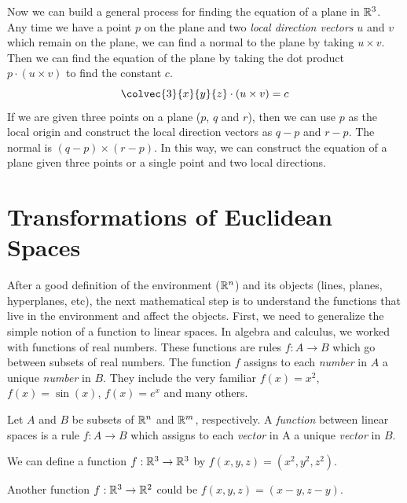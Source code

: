 \documentclass[fleqn,letterpaper]{report}
\begin{document}
Now we can build a general process for finding the
equation of a plane in $\mathbb{R}^3$. Any time we have a point $p$
on the plane and two \emph{local direction vectors} $u$ and
$v$ which remain on the plane, we can find a normal to the
plane by taking $u \times v$. Then we can find the equation
of the plane by taking the dot product $p \cdot (u \times v)$
to find the constant $c$. 
\begin{displaymath}
\colvec{3}{x}{y}{z} \cdot (u \times v) = c
\end{displaymath} 
If we are given three points on a plane ($p$, $q$ and $r$), then
we can use $p$ as the local origin and construct the local
direction vectors as $q-p$ and $r-p$. The normal is $(q-p)
\times (r-p)$. In this way, we can construct the equation of a
plane given three points or a single point and two local
directions.

\section{Transformations of Euclidean Spaces}
\label{transformations}

After a good definition of the environment ($\mathbb{R}^n$) and its
objects (lines, planes, hyperplanes, etc), the next
mathematical step is to understand the functions that live in
the environment and affect the objects.
First, we need to generalize the simple notion of a function
to linear spaces. In algebra and calculus, we worked with
functions of real numbers. These functions are rules $f: A
\rightarrow B$ which go between subsets of real numbers. The
function $f$ assigns to each \emph{number} in $A$ a unique
\emph{number} in $B$. They include the very familiar $f(x) =
x^2$, $f(x) = \sin (x)$, $f(x) = e^x$ and many others.

\begin{defn}
Let $A$ and $B$ be subsets of $\mathbb{R}^n$ and $\mathbb{R}^m$,
respectively. A \emph{function} between linear spaces is a
rule $f: A \rightarrow B$ which assigns to each \emph{vector} in
A a unique \emph{vector} in $B$.
\end{defn}

\begin{example}
We can define a function $f: \mathbb{R}^3 \rightarrow \mathbb{R}^3$ by 
$f(x,y,z) = (x^2, y^2, z^2)$. 
\end{example}

\begin{example}
Another function $f: \mathbb{R}^3 \rightarrow \mathbb{R}^2$ could be
$f(x,y,z) = (x-y, z-y)$. 
\end{example}
\end{document}
